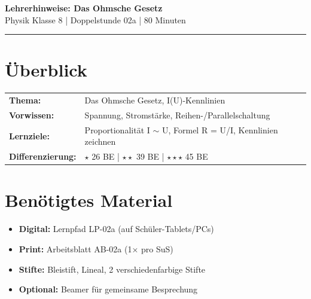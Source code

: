 \documentclass[11pt, a4paper]{article}
\begin{document}

\begin{center}
{\Large\bfseries\textcolor{fachfarbe}{Lehrerhinweise: Das Ohmsche Gesetz}}\\[0.3em]
{\small Physik Klasse 8 | Doppelstunde 02a | 80 Minuten}
\end{center}
\vspace{0.3em}
\hrule
\vspace{1em}


\section*{Überblick}

\begin{tabularx}{\textwidth}{lX}
\textbf{Thema:} & Das Ohmsche Gesetz, I(U)-Kennlinien \\
\textbf{Vorwissen:} & Spannung, Stromstärke, Reihen-/Parallelschaltung \\
\textbf{Lernziele:} & Proportionalität I $\sim$ U, Formel R = U/I, Kennlinien zeichnen \\
\textbf{Differenzierung:} & $\star$ 26 BE | $\star\star$ 39 BE | $\star\star\star$ 45 BE \\
\end{tabularx}


\section*{Benötigtes Material}

\begin{itemize}[leftmargin=1.5em, itemsep=2pt]
    \item \textbf{Digital:} Lernpfad LP-02a (auf Schüler-Tablets/PCs)
    \item \textbf{Print:} Arbeitsblatt AB-02a (1× pro SuS)
    \item \textbf{Stifte:} Bleistift, Lineal, 2 verschiedenfarbige Stifte
    \item \textbf{Optional:} Beamer für gemeinsame Besprechung
\end{itemize}
\end{document}
